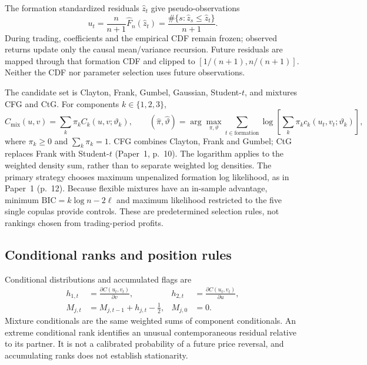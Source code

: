 The formation standardized residuals $\widehat z_t$ give pseudo-observations
\begin{equation}
 u_t=\frac{n}{n+1}\widehat F_n(\widehat z_t)
     =\frac{\#\{s:\widehat z_s\leq\widehat z_t\}}{n+1}.
\end{equation}
During trading, coefficients and the empirical CDF remain frozen; observed returns
update only the causal mean/variance recursion. Future residuals are mapped through
that formation CDF and clipped to $[1/(n+1),n/(n+1)]$. Neither the CDF nor parameter
selection uses future observations.

The candidate set is Clayton, Frank, Gumbel, Gaussian, Student-$t$, and mixtures
CFG and CtG. For components $k\in\{1,2,3\}$,
\begin{equation}
 C_{\mathrm{mix}}(u,v)=\sum_k\pi_k C_k(u,v;\vartheta_k),\qquad
 (\widehat\pi,\widehat\vartheta)=\arg\max_{\pi,\vartheta}
 \sum_{t\in\mathrm{formation}}\log\left[\sum_k\pi_k
 c_k(u_t,v_t;\vartheta_k)\right],
\end{equation}
where $\pi_k\geq0$ and $\sum_k\pi_k=1$. CFG combines Clayton, Frank and Gumbel;
CtG replaces Frank with Student-$t$ (Paper~1, p.~10). The logarithm applies to
the weighted density sum, rather than to separate weighted log densities.
The primary strategy chooses maximum unpenalized formation log likelihood, as
in Paper~1 (p.~12). Because flexible mixtures have an in-sample advantage, minimum
$\mathrm{BIC}=k\log n-2\ell$ and maximum likelihood restricted to the five single
copulas provide controls. These are predetermined selection rules, not rankings
chosen from trading-period profits.

\subsection{Conditional ranks and position rules}

Conditional distributions and accumulated flags are
\begin{align}
 h_{1,t}&=\frac{\partial C(u_t,v_t)}{\partial v},&
 h_{2,t}&=\frac{\partial C(u_t,v_t)}{\partial u},\\
 M_{j,t}&=M_{j,t-1}+h_{j,t}-\tfrac12,&M_{j,0}&=0.
\end{align}
Mixture conditionals are the same weighted sums of component conditionals.
An extreme conditional rank identifies an unusual contemporaneous residual
relative to its partner. It is not a calibrated probability of a future price
reversal, and accumulating ranks does not establish stationarity.

